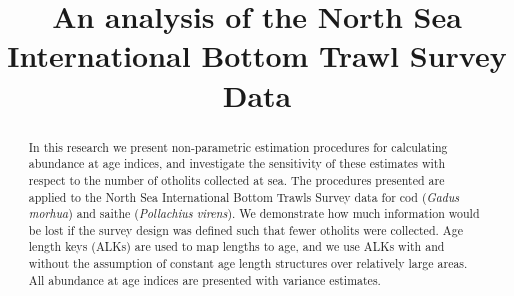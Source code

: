 \documentclass[a4paper 12pt]{article}
\title{\bf 
}
\author{}
\date{}
\numberwithin{equation}{section}
\begin{document}
\title{An analysis of the North Sea International Bottom Trawl Survey Data}

\maketitle


\begin{abstract}
In this research we present non-parametric estimation procedures for calculating abundance at age indices, and investigate the sensitivity of these estimates with respect to the number of otholits collected at sea. The procedures presented are applied to the North Sea International Bottom Trawls Survey data for cod (\textit{Gadus morhua}) and saithe (\textit{Pollachius virens}). We demonstrate how much information would be lost if the survey design was defined such that fewer otholits were collected. Age length keys (ALKs) are used to map lengths to age, and we use ALKs with and without the assumption of constant age length structures over relatively large areas. All abundance at age indices are presented with variance estimates. \\





\end{abstract}
\end{document}
